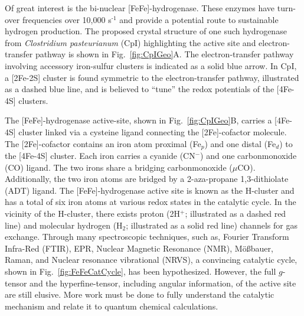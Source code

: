 Of great interest is the bi-nuclear [FeFe]-hydrogenase. \cite{PETERS20151350} These enzymes have turn-over frequencies over 10,000 s$^{\text{-1}}$\cite{CatalyticTOF} and provide a potential route to sustainable hydrogen production. The proposed crystal structure of one such hydrogenase from \textit{Clostridium pasteurianum} (CpI) highlighting the active site and electron-transfer pathway is shown in Fig.~\ref{fig:CpIGeo}A. \cite{FeFeCry} The electron-transfer pathway involving accessory iron-sulfur clusters is indicated as a solid blue arrow. In CpI, a [2Fe-2S] cluster is found symmetric to the electron-transfer pathway, illustrated as a dashed blue line, and is believed to ``tune'' the redox potentials of the [4Fe-4S] clusters. \cite{PetersPotentials} 

The [FeFe]-hydrogenase active-site, shown in Fig.~\ref{fig:CpIGeo}B, carries a [4Fe-4S] cluster linked via a cysteine ligand connecting the [2Fe]-cofactor molecule. The [2Fe]-cofactor contains an iron atom proximal (Fe$_p$) and one distal (Fe$_d$) to the [4Fe-4S] cluster. Each iron carries a cyanide (CN$^-$) and one carbonmonoxide (CO) ligand. The two irons share a bridging carbonmonoxide ($\mu$CO). Additionally, the two iron atoms are bridged by a 2-aza-propane 1,3-dithiolate (ADT) ligand. The [FeFe]-hydrogenase active site is known as the H-cluster and has a total of six iron atoms at various redox states in the catalytic cycle. In the vicinity of the H-cluster, there exists proton (2H$^+$; illustrated as a dashed red line) and molecular hydrogen (H$_2$; illustrated as a solid red line) channels for gas exchange. Through many spectroscopic techniques, such as, Fourier Transform Infra-Red (FTIR), EPR, Nuclear Magnetic Resonance (NMR), M\"o\ss{}bauer, Raman, and Nuclear resonance vibrational (NRVS), a convincing catalytic cycle, shown in Fig.~\ref{fig:FeFeCatCycle}, has been hypothesized. \cite{lubitzhyd, NRVS2017, sommer2017} However, the full $g$-tensor and the hyperfine-tensor, including angular information, of the active site are still elusive. More work must be done to fully understand the catalytic mechanism and relate it to quantum chemical calculations. 

